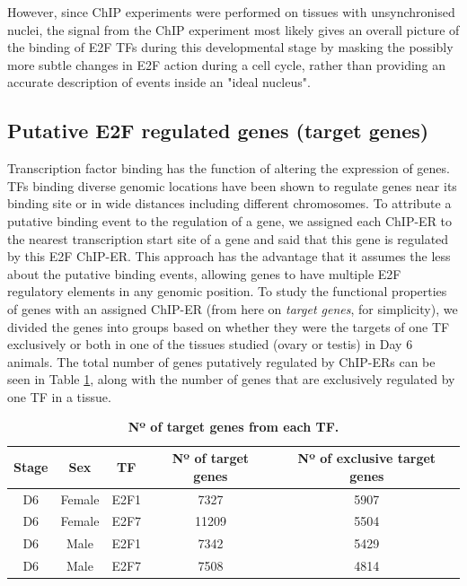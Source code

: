 \documentclass[11pt,twoside,a4paper]{report}
\begin{document}
		However, since ChIP experiments were performed on tissues with unsynchronised nuclei, the signal from the ChIP experiment most likely gives an overall picture of the binding of E2F TFs during this developmental stage by masking the possibly more subtle changes in E2F action during a cell cycle, rather than providing an accurate description of events inside an "ideal nucleus".
		
	\subsection{Putative E2F regulated genes (target genes)}
		Transcription factor binding has the function of altering the expression of genes. TFs binding diverse genomic locations have been shown to regulate genes near its binding site or in wide distances including different chromosomes. To attribute a putative binding event to the regulation of a gene, we assigned each ChIP-ER to the nearest transcription start site of a gene and said that this gene is regulated by this E2F ChIP-ER. This approach has the advantage that it assumes the less about the putative binding events, allowing genes to have multiple E2F regulatory elements in any genomic position. To study the functional properties of genes with an assigned ChIP-ER (from here on \textit{target genes}, for simplicity), we divided the genes into groups based on whether they were the targets of one TF exclusively or both in one of the tissues studied (ovary or testis) in Day 6 animals. The total number of genes putatively regulated by ChIP-ERs can be seen in Table \ref{table:No_target_genes}, along with the number of genes that are exclusively regulated by one TF in a tissue.
		
		\begin{table}[H]
       		\caption{\bf{Nº of target genes from each TF.}}
       		\begin{center}
           		\begin{tabular}{c|c|c|c|c}
                	\textbf{Stage} & \textbf{Sex} & \textbf{TF} & \textbf{Nº of target genes} & \textbf{Nº of exclusive target genes}\\
   		            \hline
       		        D6 & Female & E2F1 & 7327 & 5907\\
           		    D6 & Female & E2F7 & 11209 & 5504\\
					D6 & Male & E2F1 & 7342 & 5429\\
					D6 & Male & E2F7 & 7508 & 4814\\
            	\end{tabular}
   		    \end{center}
   		    \label{table:No_target_genes}
	    \end{table}
		
\end{document}
